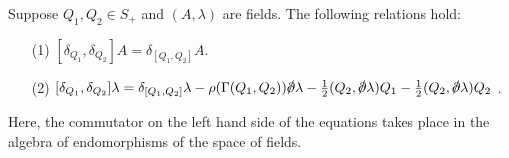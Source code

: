 \documentclass[10pt, oneside]{article}
\begin{document}
\begin{lemma} \label{10d_onshell_lemma}
Suppose $Q_1, Q_2 \in S_+$ and $(A, \lambda)$ are fields.
The following relations hold:
\begin{itemize}
\item[(1)] \label{10dsusyA} $ [\delta_{Q_1}, \delta_{Q_2}] A = \delta_{[Q_1, Q_2]} A$.
\item[(2)] \label{10dsusyL} $ [\delta_{Q_1}, \delta_{Q_2}] \lambda = \delta_{[Q_1,Q_2]} \lambda - \rho(\Gamma(Q_1,Q_2)) \sd \dd \lambda - \frac 12(Q_2, \sd \dd \lambda)Q_1 - \frac 12(Q_2, \sd \dd \lambda)Q_2$ .
\end{itemize}
Here, the commutator on the left hand side of the equations takes place in the algebra of endomorphisms of the space of fields.
\end{lemma}
\end{document}
